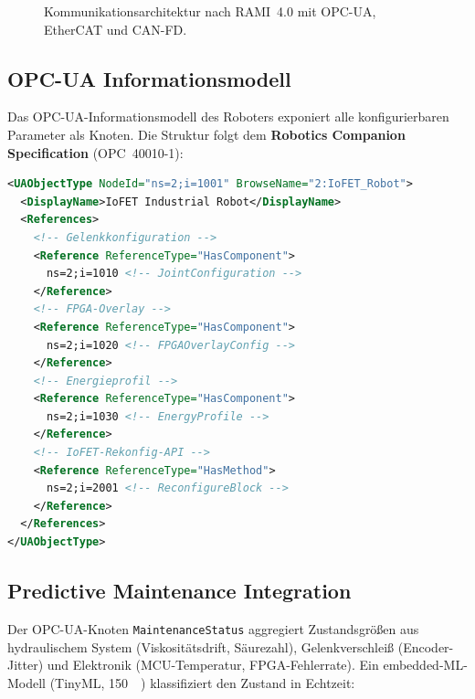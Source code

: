 ﻿\documentclass[a4paper,12pt]{scrreprt}
\theoremstyle{definition}
\begin{document}
\begin{figure}[H]
\caption{Kommunikationsarchitektur nach RAMI~4.0 mit OPC-UA, EtherCAT
  und CAN-FD.}
\label{fig:komm}
\end{figure}

\subsection{OPC-UA Informationsmodell}

Das OPC-UA-Informationsmodell des Roboters exponiert alle
konfigurierbaren Parameter als Knoten. Die Struktur folgt dem
\textbf{Robotics Companion Specification} (OPC~40010-1):

\begin{lstlisting}[caption={OPC-UA NodeSet -- Ausschnitt IoFET-Roboterknoten},
  language=XML]
<UAObjectType NodeId="ns=2;i=1001" BrowseName="2:IoFET_Robot">
  <DisplayName>IoFET Industrial Robot</DisplayName>
  <References>
    <!-- Gelenkkonfiguration -->
    <Reference ReferenceType="HasComponent">
      ns=2;i=1010 <!-- JointConfiguration -->
    </Reference>
    <!-- FPGA-Overlay -->
    <Reference ReferenceType="HasComponent">
      ns=2;i=1020 <!-- FPGAOverlayConfig -->
    </Reference>
    <!-- Energieprofil -->
    <Reference ReferenceType="HasComponent">
      ns=2;i=1030 <!-- EnergyProfile -->
    </Reference>
    <!-- IoFET-Rekonfig-API -->
    <Reference ReferenceType="HasMethod">
      ns=2;i=2001 <!-- ReconfigureBlock -->
    </Reference>
  </References>
</UAObjectType>
\end{lstlisting}

\subsection{Predictive Maintenance Integration}

Der OPC-UA-Knoten \texttt{MaintenanceStatus} aggregiert
Zustandsgrößen aus hydraulischem System (Viskositätsdrift,
Säurezahl), Gelenkverschleiß (Encoder-Jitter) und
Elektronik (MCU-Temperatur, FPGA-Fehlerrate). Ein
embedded-ML-Modell (TinyML, \SI{150}{\kilo\byte}) klassifiziert
den Zustand in Echtzeit:
\end{document}
